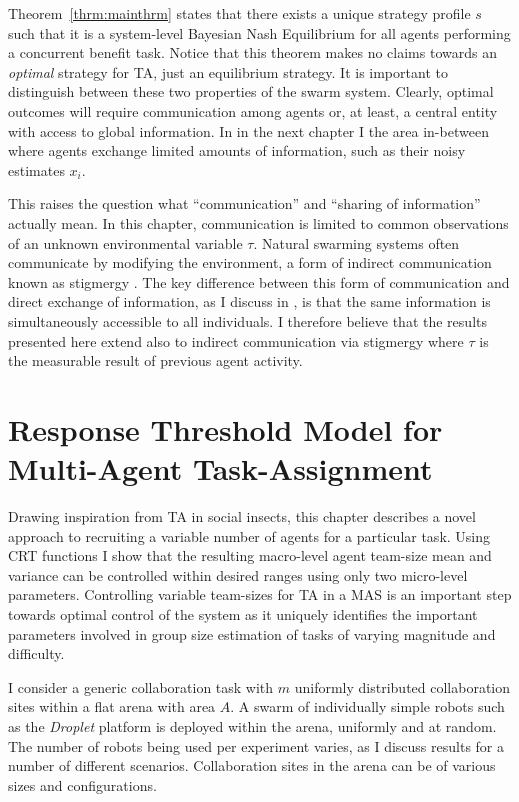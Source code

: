 \documentclass[defaultstyle,12pt]{thesis}
\begin{document}
Theorem~\ref{thrm:mainthrm} states that there exists a unique strategy profile $s$ such that it is a system-level Bayesian Nash Equilibrium for all agents performing a concurrent benefit task. Notice that this theorem makes no claims towards an \emph{optimal} strategy for TA, just an equilibrium strategy. It is important to distinguish between these two properties of the swarm system. Clearly, optimal outcomes will require communication among agents or, at least, a central entity with access to global information. In in the next chapter I the area in-between where agents exchange limited amounts of information, such as their noisy estimates $x_i$.

This raises the question what ``communication'' and ``sharing of information'' actually mean. In this chapter, communication is limited to common observations of an unknown environmental variable $\tau$. Natural swarming systems often communicate by modifying the environment, a form of indirect communication known as stigmergy \cite{Grasse1959}. The key difference between this form of communication and direct exchange of information, as I discuss in \cite{Touri2014}, is that the same information is simultaneously accessible to all individuals. I therefore believe that the results presented here extend also to indirect communication via stigmergy where $\tau$ is the measurable result of previous agent activity.


\chapter{Response Threshold Model for Multi-Agent Task-Assignment}\label{ch:resthmodel}
Drawing inspiration from TA in social insects, this chapter describes a novel approach to recruiting a variable number of agents for a particular task. Using CRT functions I show that the resulting macro-level agent team-size mean and variance can be controlled within desired ranges using only two micro-level parameters. Controlling variable team-sizes for TA in a MAS is an important step towards optimal control of the system as it uniquely identifies the important parameters involved in group size estimation of tasks of varying magnitude and difficulty. 

I consider a generic collaboration task with $m$ uniformly distributed collaboration sites within a flat arena with area $A$. A swarm of individually simple robots such as the \emph{Droplet} platform \cite{Farrow2014,Klingner2014} is deployed within the arena, uniformly and at random. The number of robots being used per experiment varies, as I discuss results for a number of different scenarios. Collaboration sites in the arena can be of various sizes and configurations.
\end{document}
